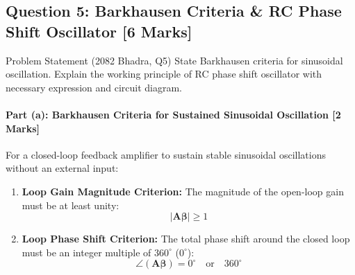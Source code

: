 \documentclass[11pt,a4paper,oneside]{book}
\begin{document}
\vspace{0.6cm}

\subsection{Question 5: Barkhausen Criteria \& RC Phase Shift Oscillator [6 Marks]}
\begin{questionbox}{Problem Statement (2082 Bhadra, Q5)}
State Barkhausen criteria for sinusoidal oscillation. Explain the working principle of RC phase shift oscillator with necessary expression and circuit diagram.
\end{questionbox}

\paragraph{Part (a): Barkhausen Criteria for Sustained Sinusoidal Oscillation [2 Marks]}
For a closed-loop feedback amplifier to sustain stable sinusoidal oscillations without an external input:
\begin{enumerate}[leftmargin=1.5em]
  \item \textbf{Loop Gain Magnitude Criterion:} The magnitude of the open-loop gain must be at least unity:
  \[
  |\mathbf{A \beta}| \ge 1
  \]
  \item \textbf{Loop Phase Shift Criterion:} The total phase shift around the closed loop must be an integer multiple of $360^\circ$ ($0^\circ$):
  \[
  \angle (\mathbf{A \beta}) = 0^\circ \quad \text{or} \quad 360^\circ
  \]
\end{enumerate}
\end{document}
